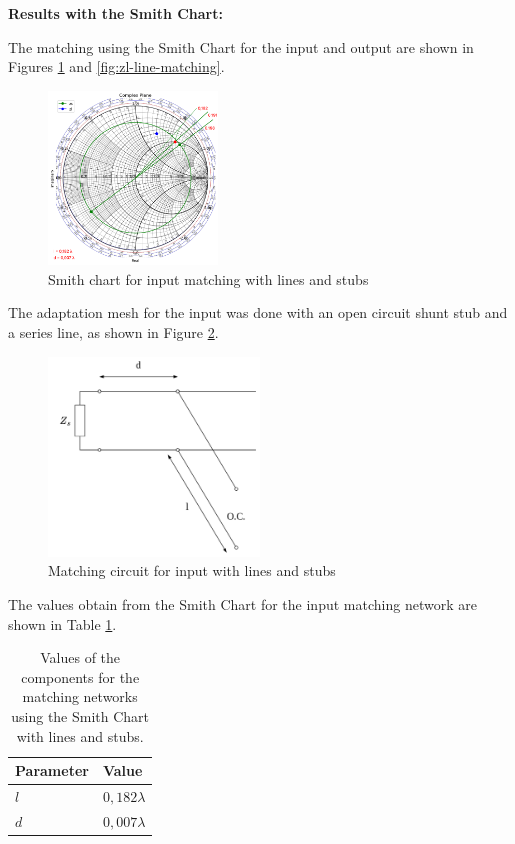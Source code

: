 \vspace{0.4cm}
\textbf{Results with the Smith Chart:}
\vspace{0.4cm}

The matching using the Smith Chart for the input and output are shown in Figures \ref{fig:zs-line-matching} and \ref{fig:zl-line-matching}.

\begin{figure}[H]
    \centering
    \includegraphics[width=0.4\textwidth]{Images/zs-LS-matching.png}
    \caption{Smith chart for input matching with lines and stubs}
    \label{fig:zs-line-matching}
\end{figure}

The adaptation mesh for the input was done with an open circuit shunt stub and a series line, as shown in Figure \ref{fig:zs_LS_circuit}.

\begin{figure}[H]
    \centering
    \includegraphics[width=0.5\textwidth]{Images/zs_LS_circuit.png}
    \caption{Matching circuit for input with lines and stubs}
    \label{fig:zs_LS_circuit}
\end{figure}

The values obtain from the Smith Chart for the input matching network are shown in Table \ref{tab:MatchingValuesLinesin}.

\begin{table}[H]
    \centering
    \caption{Values of the components for the matching networks using the Smith Chart with lines and stubs.}
    \begin{tabularx}{\textwidth}{>{\centering\arraybackslash}X >{\centering\arraybackslash}X}
        \toprule
        \textbf{Parameter} & \textbf{Value} \\
        \midrule
        $l$     & $0,182\lambda$ \\
        \midrule
        $d$   & $0,007\lambda$ \\
        \bottomrule
    \end{tabularx}
    \label{tab:MatchingValuesLinesin}
\end{table}

